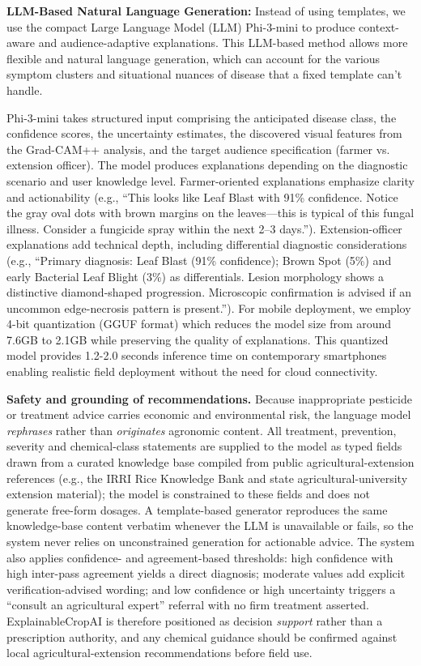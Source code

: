 \documentclass[pdflatex,sn-mathphys-num]{sn-jnl}%
\begin{document}
\textbf{LLM-Based Natural Language Generation:} Instead of using templates, we use the compact Large Language Model (LLM) Phi-3-mini \cite{abdin2024phi3} to produce context-aware and audience-adaptive explanations. This LLM-based method allows more flexible and natural language generation, which can account for the various symptom clusters and situational nuances of disease that a fixed template can't handle.

Phi-3-mini takes structured input comprising the anticipated disease class, the confidence scores, the uncertainty estimates, the discovered visual features from the Grad-CAM++ analysis, and the target audience specification (farmer vs. extension officer). The model produces explanations depending on the diagnostic scenario and user knowledge level. Farmer-oriented explanations emphasize clarity and actionability (e.g., ``This looks like Leaf Blast with 91\% confidence. Notice the gray oval dots with brown margins on the leaves---this is typical of this fungal illness. Consider a fungicide spray within the next 2--3 days.''). Extension-officer explanations add technical depth, including differential diagnostic considerations (e.g., ``Primary diagnosis: Leaf Blast (91\% confidence); Brown Spot (5\%) and early Bacterial Leaf Blight (3\%) as differentials. Lesion morphology shows a distinctive diamond-shaped progression. Microscopic confirmation is advised if an uncommon edge-necrosis pattern is present.''). For mobile deployment, we employ 4-bit quantization (GGUF format) which reduces the model size from around 7.6GB to 2.1GB while preserving the quality of explanations. This quantized model provides 1.2-2.0 seconds inference time on contemporary smartphones enabling realistic field deployment without the need for cloud connectivity.

\textbf{Safety and grounding of recommendations.} Because inappropriate pesticide or treatment advice carries economic and environmental risk, the language model \emph{rephrases} rather than \emph{originates} agronomic content. All treatment, prevention, severity and chemical-class statements are supplied to the model as typed fields drawn from a curated knowledge base compiled from public agricultural-extension references (e.g., the IRRI Rice Knowledge Bank and state agricultural-university extension material); the model is constrained to these fields and does not generate free-form dosages. A template-based generator reproduces the same knowledge-base content verbatim whenever the LLM is unavailable or fails, so the system never relies on unconstrained generation for actionable advice. The system also applies confidence- and agreement-based thresholds: high confidence with high inter-pass agreement yields a direct diagnosis; moderate values add explicit verification-advised wording; and low confidence or high uncertainty triggers a ``consult an agricultural expert'' referral with no firm treatment asserted. ExplainableCropAI is therefore positioned as decision \emph{support} rather than a prescription authority, and any chemical guidance should be confirmed against local agricultural-extension recommendations before field use.
\end{document}
